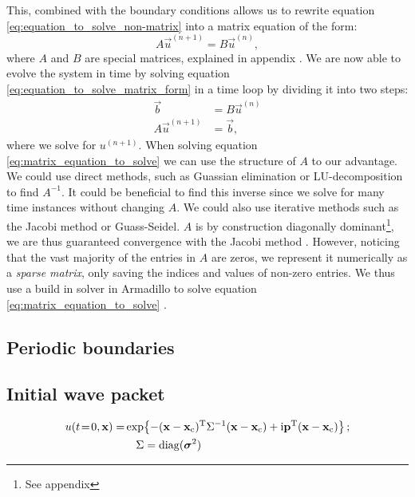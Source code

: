         This, combined with the boundary conditions allows us to rewrite equation \eqref{eq:equation_to_solve_non-matrix} into a matrix equation of the form:
        \begin{equation}\label{eq:equation_to_solve_matrix_form}
            A\vec{u}^{(n+1)} = B\vec{u}^{(n)},
        \end{equation}
        where $A$ and $B$ are special matrices, explained in appendix . 
        We are now able to evolve the system in time by solving equation \eqref{eq:equation_to_solve_matrix_form} in a time loop by dividing it into two steps:
        \begin{equation}\label{eq:matrix_equation_to_solve}
            \begin{split}
                \vec{b} &= B\vec{u}^{(n)} \\
                A\vec{u}^{(n+1)} &= \vec{b},
            \end{split}
        \end{equation}
        where we solve for $u^{(n+1)}$. When solving equation \eqref{eq:matrix_equation_to_solve} we can use the structure of $A$ to our advantage. We could use direct methods, such as Guassian elimination or LU-decomposition to find $A^{-1}$. It could be beneficial to find this inverse since we solve for many time instances without changing $A$. We could also use iterative methods such as the Jacobi method or Guass-Seidel. $A$ is by construction diagonally dominant\footnote{See appendix }, we are thus guaranteed convergence with the Jacobi method . However, noticing that the vast majority of the entries in $A$ are zeros, we represent it numerically as a \textit{sparse matrix}, only saving the indices and values of non-zero entries. We thus use a build in solver in Armadillo to solve equation \eqref{eq:matrix_equation_to_solve} \citep{lecture_notes}.

\subsection{Periodic boundaries}\label{sec:method:periodic_boundaries}

\subsection{Initial wave packet}\label{sec:method:initial_wave}


    \begin{equation}\label{eq:p4_initial_condition}
    \begin{split}
        u(t\!=\!0, \mathbf{x}) = & \exp{-(\mathbf{x}-\mathbf{x}_\mathrm{c})^\mathrm{T}\Sigma^{-1}(\mathbf{x}-\mathbf{x}_\mathrm{c}) + \mathrm{i}\mathbf{p}^\mathrm{T}(\mathbf{x}-\mathbf{x}_\mathrm{c})} \,;  \\ 
        &\quad\Sigma = \mathrm{diag}(\boldsymbol{\sigma}^2)  
    \end{split}
    \end{equation}
 
